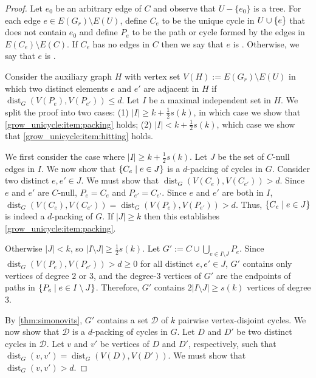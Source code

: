 \documentclass{patmorin}
\DeclareMathOperator{\dist}{dist}
\DeclarePairedDelimiter\set{\{}{\}}
\begin{document}
\begin{proof}
  Let $e_0$ be an arbitrary edge of $C$ and observe that $U-\{e_0\}$ is a tree.  For each edge $e\in E(G_{r})\setminus E(U)$,  define $C_e$ to be the unique cycle in $U\cup \set{e}$ 
  that does not contain $e_0$ and define $P_{e}$ to be the path or cycle formed by the edges in $E(C_{e})\setminus E(C)$.
  If $C_e$ has no edges in $C$ then we say that $e$ is .
  Otherwise, we say that $e$ is .
  
  Consider the auxiliary graph $H$ with vertex set $V(H):= E(G_{r})\setminus E(U)$ in which two distinct elements $e$ and $e'$ are adjacent in $H$ if $\dist_G(V(P_{e}),V(P_{e'})) \le d$.  Let $I$ be a maximal independent set in $H$. 
  We split the proof into two cases: 
  (1) $|I|\ge k+\frac{1}{2}s(k)$, in which case we show that \cref{grow_unicycle:item:packing} holds;
  (2) $|I|< k+\frac{1}{2}s(k)$, which case we show that \cref{grow_unicycle:item:hitting} holds.
  
  We first consider the case where $|I|\ge k+\frac{1}{2}s(k)$.  Let $J$ be the set of $C$-null edges in $I$. 
  We now show that $\set{C_e \mid e\in J}$ is a $d$-packing of cycles in $G$.  Consider two distinct $e,e'\in J$.  We must show that $\dist_G(V(C_e),V(C_{e'}))>d$.
  Since $e$ and $e'$ are $C$-null, $P_e=C_e$ and $P_{e'}=C_{e'}$.
  Since $e$ and $e'$ are both in $I$, $\dist_G(V(C_e),V(C_{e'}))=\dist_G(V(P_e),V(P_{e'}))>d$. 
  Thus, $\set{C_e \mid e\in J}$ is indeed a $d$-packing of $G$.  If $|J|\ge k$ then this establishes \eqref{grow_unicycle:item:packing}.  

  Otherwise $|J|<k$, so $|I\setminus J|\ge \tfrac{1}{2}s(k)$.
  Let $G':=C\cup\bigcup_{e\in I\setminus J} P_e$.
  Since $\dist_G(V(P_e),V(P_{e'}))>d\ge0$ for all distinct $e,e'\in J$, $G'$ contains only vertices of degree $2$ or $3$, and the degree-$3$ vertices of $G'$ are the endpoints of paths in $\set{P_e \mid e\in I\setminus J}$.
  Therefore, $G'$ contains $2|I\setminus J|\geq s(k)$ vertices of degree $3$.
  
  By \cref{thm:simonovits}, $G'$ contains a set $\mathcal{D}$ of $k$ pairwise vertex-disjoint cycles.
  We now show that $\mathcal{D}$ is a $d$-packing of cycles in $G$.
  Let $D$ and $D'$ be two distinct cycles in $\mathcal{D}$.
  Let $v$ and $v'$ be vertices of $D$ and $D'$, respectively,
  such that $\dist_G(v,v')=\dist_G(V(D),V(D'))$.  We must show that $\dist_G(v,v')>d$.


\end{proof}
\end{document}
